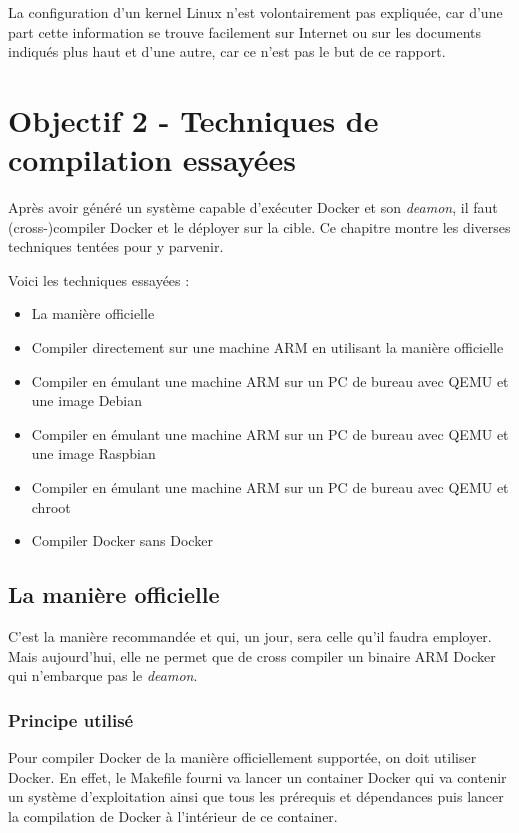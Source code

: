 \documentclass[11pt,a4paper,oneside]{report}
\begin{document}
La configuration d'un kernel Linux n'est volontairement pas expliquée, car d'une part cette information se trouve facilement sur Internet ou sur les documents indiqués plus haut et d'une autre, car ce n'est pas le but de ce rapport.

\chapter{Objectif 2 - Techniques de compilation essayées}

Après avoir généré un système capable d'exécuter Docker et son \textit{deamon}, il faut (cross-)compiler Docker et le déployer sur la cible. Ce chapitre montre les diverses techniques tentées pour y parvenir.

Voici les techniques essayées :
\begin{itemize}
\item La manière officielle
\item Compiler directement sur une machine ARM en utilisant la manière officielle
\item Compiler en émulant une machine ARM sur un PC de bureau avec QEMU et une image Debian
\item Compiler en émulant une machine ARM sur un PC de bureau avec QEMU et une image Raspbian
\item Compiler en émulant une machine ARM sur un PC de bureau avec QEMU et chroot
\item Compiler Docker sans Docker
\end{itemize}

\section{La manière officielle}\label{maniere_officielle}

C'est la manière recommandée et qui, un jour, sera celle qu'il faudra
employer. Mais aujourd'hui, elle ne permet que de cross compiler un
binaire ARM Docker qui n'embarque pas le \emph{deamon}.

\subsection{Principe utilisé}

Pour compiler Docker de la manière officiellement supportée, on doit utiliser Docker. En effet, le Makefile fourni va lancer un container Docker qui va contenir un système d'exploitation ainsi que tous les prérequis et dépendances puis lancer la compilation de Docker à l'intérieur de ce container.
\end{document}
